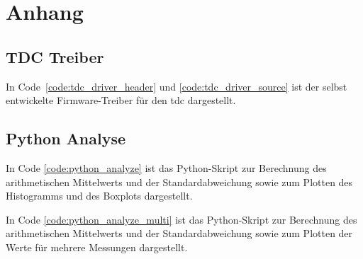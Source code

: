 \documentclass[11pt,a4paper,hidelinks]{article}
\begin{document}
\section{Anhang}

\subsection{TDC Treiber}\label{sec:tdc_driver}

In Code~\ref{code:tdc_driver_header} und \ref{code:tdc_driver_source} ist der selbst entwickelte Firmware-Treiber für
den \acrshort{tdc} dargestellt.




\subsection{Python Analyse}\label{sec:python_analyze}

In Code \ref{code:python_analyze} ist das Python-Skript zur Berechnung des arithmetischen Mittelwerts und der
Standardabweichung sowie zum Plotten des Histogramms und des Boxplots dargestellt.



In Code \ref{code:python_analyze_multi} ist das Python-Skript zur Berechnung des arithmetischen Mittelwerts und der
Standardabweichung sowie zum Plotten der Werte für mehrere Messungen dargestellt.


\pagebreak
\end{document}
